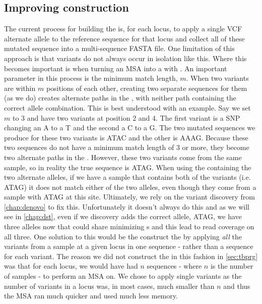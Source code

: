 \subsection{Improving \prg{} construction}
The current process for building the \mtb{} \prg{} is, for each locus, to apply a single VCF alternate allele to the reference sequence for that locus and collect all of these mutated sequence into a multi-sequence FASTA file. One limitation of this approach is that variants do not always occur in isolation like this. Where this becomes important is when turning an MSA into a \prg{} with \makeprg{}. An important parameter in this process is the minimum match length, $m$. When two variants are within $m$ positions of each other, creating two separate sequences for them (as we do) creates alternate paths in the \prg{}, with neither path containing the correct allele combination. This is best understood with an example. Say we set $m$ to 3 and have two variants at position 2 and 4. The first variant is a SNP changing an A to a T and the second a C to a G. The two mutated sequences we produce for these two variants is ATAC and the other is AAAG. Because these two sequences do not have a minimum match length of 3 or more, they become two alternate paths in the \prg{}. However, these two variants come from the same sample, so in reality the true sequence is ATAG. When using the \prg{} containing the two alternate alleles, if we have a sample that contains both of the variants (i.e. ATAG) it does not match either of the two alleles, even though they come from a sample with ATAG at this site. Ultimately, we rely on the \denovo{} variant discovery from \autoref{chap:denovo} to fix this. Unfortunately it doesn't always do this and as we will see in \autoref{chap:dst}, even if we \denovo{} discovery adds the correct allele, ATAG, we have three alleles now that could share minimizing \kmer{}s and this lead to read coverage on all three. One solution to this would be the construct the \prg{} by applying \emph{all} the variants from a sample at a given locus in one sequence - rather than a sequence for each variant. The reason we did not construct the \prg{} in this fashion in \autoref{sec:tbprg} was that for each locus, we would have had $n$ sequences - where $n$ is the number of samples - to perform an MSA on. We chose to apply single variants as the number of variants in a locus was, in most cases, much smaller than $n$ and thus the MSA ran much quicker and used much less memory.
